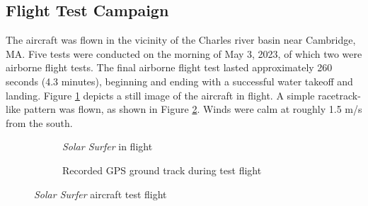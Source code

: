 \documentclass[conf]{new-aiaa}
\begin{document}
    \subsection{Flight Test Campaign}

    The aircraft was flown in the vicinity of the Charles river basin near Cambridge, MA. Five tests were conducted on the morning of May 3, 2023, of which two were airborne flight tests. The final airborne flight test lasted approximately 260 seconds (4.3 minutes), beginning and ending with a successful water takeoff and landing. Figure \ref{fig:solar_surfer_flight} depicts a still image of the aircraft in flight. A simple racetrack-like pattern was flown, as shown in Figure \ref{fig:solar_surfer_track}. Winds were calm at roughly 1.5 m/s from the south.

    \begin{figure}[!htb]
        \centering
        \begin{subfigure}[b]{0.45\textwidth}
            \caption{\emph{Solar Surfer} in flight}
            \label{fig:solar_surfer_flight}
        \end{subfigure}
        \hfill
        \begin{subfigure}[b]{0.511\textwidth}
            \caption{Recorded GPS ground track during test flight}
            \label{fig:solar_surfer_track}
        \end{subfigure}
        \caption{\emph{Solar Surfer} aircraft test flight}
        \label{fig:solar_surfer_aircraft}
    \end{figure}
\end{document}
